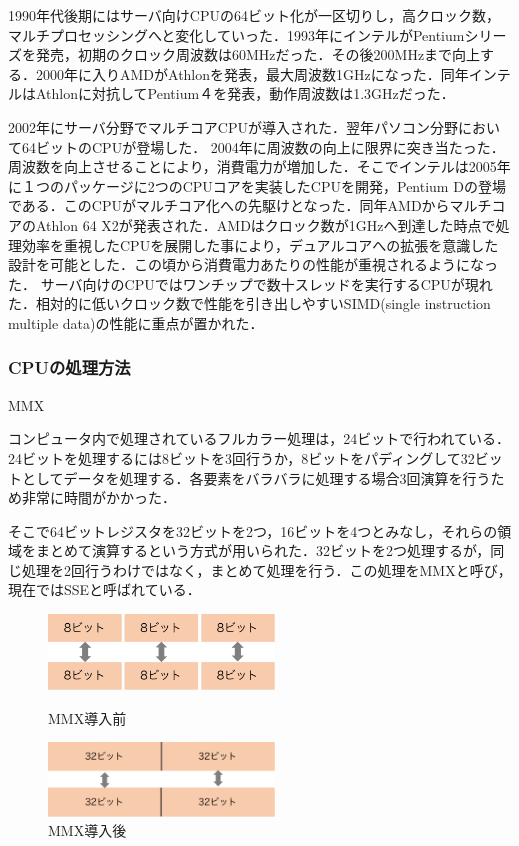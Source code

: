 \documentclass[a4j,12pt]{jsarticle}
\begin{document}
1990年代後期にはサーバ向けCPUの64ビット化が一区切りし，高クロック数，マルチプロセッシングへと変化していった．1993年にインテルがPentiumシリーズを発売，初期のクロック周波数は60MHzだった．その後200MHzまで向上する．2000年に入りAMDがAthlonを発表，最大周波数1GHzになった．同年インテルはAthlonに対抗してPentium４を発表，動作周波数は1.3GHzだった．

2002年にサーバ分野でマルチコアCPUが導入された．翌年パソコン分野において64ビットのCPUが登場した．
2004年に周波数の向上に限界に突き当たった．周波数を向上させることにより，消費電力が増加した．そこでインテルは2005年に１つのパッケージに2つのCPUコアを実装したCPUを開発，Pentium Dの登場である．このCPUがマルチコア化への先駆けとなった．同年AMDからマルチコアのAthlon 64 X2が発表された．AMDはクロック数が1GHzへ到達した時点で処理効率を重視したCPUを展開した事により，デュアルコアへの拡張を意識した設計を可能とした．この頃から消費電力あたりの性能が重視されるようになった．
サーバ向けのCPUではワンチップで数十スレッドを実行するCPUが現れた．相対的に低いクロック数で性能を引き出しやすいSIMD(single instruction multiple data)の性能に重点が置かれた．

\subsubsection{CPUの処理方法}
\begin{Large}
MMX
\end {Large}

コンピュータ内で処理されているフルカラー処理は，24ビットで行われている．24ビットを処理するには8ビットを3回行うか，8ビットをパディングして32ビットとしてデータを処理する．各要素をバラバラに処理する場合3回演算を行うため非常に時間がかかった．

そこで64ビットレジスタを32ビットを2つ，16ビットを4つとみなし，それらの領域をまとめて演算するという方式が用いられた．32ビットを2つ処理するが，同じ処理を2回行うわけではなく，まとめて処理を行う．この処理をMMXと呼び，現在ではSSEと呼ばれている．

\begin{figure}[htbp]
 \begin{minipage}{0.5\hsize}
  \begin{center}
   \includegraphics[width=60mm]{MMX.pdf}
  \end{center}
  \caption{MMX導入前}
  \label{fig:MMX}
 \end{minipage}
 \begin{minipage}{0.5\hsize}
  \begin{center}
   \includegraphics[width=60mm]{MMX2.pdf}
  \end{center}
  \caption{MMX導入後}
  \label{fig:MMX2}
 \end{minipage}
\end{figure}
\end{document}
